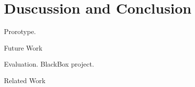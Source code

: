 \section{Duscussion and Conclusion}

Prorotype.

Future Work

Evaluation. BlackBox project.

Related Work
